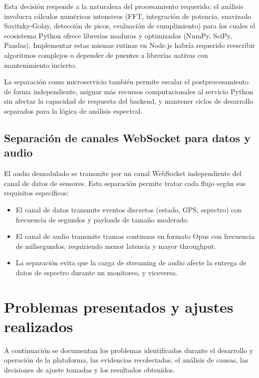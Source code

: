 Esta decisión responde a la naturaleza del procesamiento requerido: el análisis
involucra cálculos numéricos intensivos (FFT, integración de potencia,
suavizado Savitzky-Golay, detección de picos, evaluación de cumplimiento)
para los cuales el ecosistema Python ofrece librerías maduras y optimizadas
(NumPy, SciPy, Pandas). Implementar estas mismas rutinas en Node.js habría
requerido reescribir algoritmos complejos o depender de puentes a librerías
nativas con mantenimiento incierto.

La separación como microservicio también permite escalar el postprocesamiento
de forma independiente, asignar más recursos computacionales al servicio
Python sin afectar la capacidad de respuesta del backend, y mantener
ciclos de desarrollo separados para la lógica de análisis espectral.

\subsection{Separación de canales WebSocket para datos y audio}

El audio demodulado se transmite por un canal WebSocket independiente del
canal de datos de sensores. Esta separación permite tratar cada flujo según
sus requisitos específicos:

\begin{itemize}
    \item El canal de datos transmite eventos discretos (estado, GPS,
    espectro) con frecuencia de segundos y payloads de tamaño moderado.
    \item El canal de audio transmite tramas continuas en formato Opus con
    frecuencia de milisegundos, requiriendo menor latencia y mayor throughput.
    \item La separación evita que la carga de streaming de audio afecte la
    entrega de datos de espectro durante un monitoreo, y viceversa.
\end{itemize}

\section{Problemas presentados y ajustes realizados}

A continuación se documentan los problemas identificados durante el desarrollo
y operación de la plataforma, las evidencias recolectadas, el análisis de
causas, las decisiones de ajuste tomadas y los resultados obtenidos.

